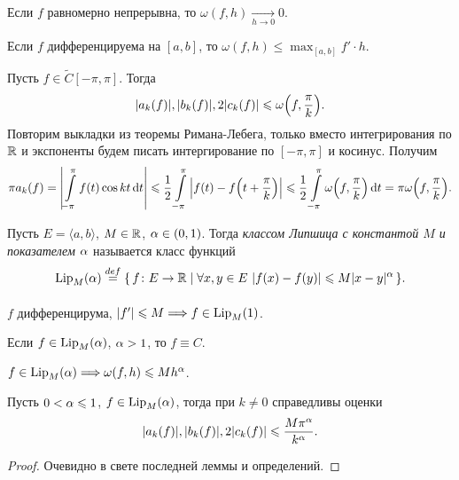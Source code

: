\begin{remark}
    Если $f$ равномерно непрерывна, то $\omega(f, h) \xrightarrow[h \to 0]{} 0$.
\end{remark}

\begin{remark}
    Если $f$ дифференцируема на $[a, b]$, то $\omega(f, h) \leqslant \max_{[a, b]}{f'} \cdot h$.
\end{remark}

\begin{lemma}
    Пусть $f \in \widetilde{C}[-\pi, \pi]$. Тогда
    \[
        |a_k(f)|, |b_k(f)|, 2|c_k(f)| \leqslant \omega\parens*{f, \frac{\pi}{k}}
    .\]
    Повторим выкладки из теоремы Римана-Лебега, только вместо интегрирования по $\mathbb{R}$
    и экспоненты будем писать интергирование по $[-\pi, \pi]$ и косинус. Получим
    \[
        \pi a_k(f) = \abs*{\intl_{-\pi}^\pi{f(t) \cos{kt} \dd t}} \leqslant \frac{1}{2}
        \intl_{-\pi}^\pi{\abs*{f(t) - f\parens*{t + \frac{\pi}{k}}}} \leqslant
        \frac{1}{2} \intl_{-\pi}^\pi{\omega\parens*{f, \frac{\pi}{k}}\dd t} =
        \pi \omega\parens*{f, \frac{\pi}{k}}
    .\]
\end{lemma}

\begin{definition}
    Пусть $E = \langle a, b \rangle$, $M \in \mathbb{R}$, $\alpha \in (0, 1)$. Тогда
    \textit{классом Липшица с константой $M$ и показателем $\alpha$}
    называется класс функций
    \[
        \operatorname{Lip}_M(\alpha) \overset{def}{\underset{}{=}} \{\, f\colon E \to \mathbb{R} \mid \forall x, y \in E~
        |f(x) - f(y)| \leqslant M |x - y|^\alpha \,\} 
    .\]
\end{definition}

\begin{remark}
    $f$ дифференцирума, $|f'| \leqslant M \Longrightarrow f \in \operatorname{Lip}_M(1)$.
\end{remark}

\begin{remark}
    Если $f \in \operatorname{Lip}_M(\alpha)$, $\alpha > 1$, то $f \equiv C$.
\end{remark}

\begin{remark}
    $f \in \operatorname{Lip}_M(\alpha) \Longrightarrow \omega(f, h) \leqslant M h^\alpha$.
\end{remark}

\begin{corollary}
    Пусть $0 < \alpha \leqslant 1$, $f \in \operatorname{Lip}_M(\alpha)$, тогда при $k \neq 0$
    справедливы оценки
    \[
        |a_k(f)|, |b_k(f)|, 2|c_k(f)| \leqslant \frac{M \pi^\alpha}{k^\alpha}
    .\]
\end{corollary}
\begin{proof}
    Очевидно в свете последней леммы и определений.
\end{proof}

